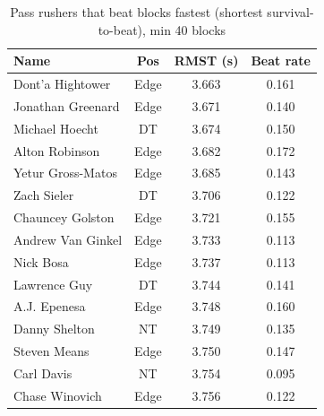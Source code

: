 \begin{table}[h!]
\centering
\footnotesize
\begin{tabular}{lccc}
\toprule
Name & Pos & RMST (s) & Beat rate \\
\midrule
Dont'a Hightower & Edge & 3.663 & 0.161 \\
Jonathan Greenard & Edge & 3.671 & 0.140 \\
Michael Hoecht & DT & 3.674 & 0.150 \\
Alton Robinson & Edge & 3.682 & 0.172 \\
Yetur Gross-Matos & Edge & 3.685 & 0.143 \\
Zach Sieler & DT & 3.706 & 0.122 \\
Chauncey Golston & Edge & 3.721 & 0.155 \\
Andrew Van Ginkel & Edge & 3.733 & 0.113 \\
Nick Bosa & Edge & 3.737 & 0.113 \\
Lawrence Guy & DT & 3.744 & 0.141 \\
A.J. Epenesa & Edge & 3.748 & 0.160 \\
Danny Shelton & NT & 3.749 & 0.135 \\
Steven Means & Edge & 3.750 & 0.147 \\
Carl Davis & NT & 3.754 & 0.095 \\
Chase Winovich & Edge & 3.756 & 0.122 \\
\bottomrule
\end{tabular}
\caption{Pass rushers that beat blocks fastest (shortest survival-to-beat), min 40 blocks}
\label{tab:rusher_shedding}
\end{table}

